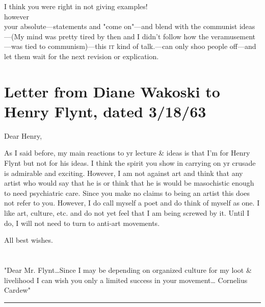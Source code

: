 \vfill
\noindent I think you were right in not giving examples! \\
\vfill
\noindent however \\
your absolute---statements and "come on"---and blend with the communist 
ideas---(My mind was pretty tired by then and I didn't follow how the 
veramusement---was tied to communism)---this \textsc{it} kind of talk.---can only shoo 
people off---and let them wait for the next revision or explication. 

\vfill


\clearpage

\section*{}

\section*{{\normalsize Letter from Diane Wakoski to Henry Flynt, dated 3/18/63}}

\vfill
\vfill

Dear Henry, 

\vfill

As I said before, my main reactions to yr lecture \& ideas is that I'm for 
Henry Flynt but not for his ideas. I think the spirit you show in carrying on 
yr crusade is admirable and exciting. However, I am not against art and think 
that any artist who would say that he is or think that he is would be 
masochistic enough to need psychiatric care. Since you make no claims to 
being an artist this does not refer to you. However, I do call myself a poet 
and do think of myself as one. I like art, culture, etc. and do not yet feel 
that I am being screwed by it. Until I do, I will not need to turn to anti-art 
movements. 

All best wishes. 

\vfill


\vfill
\vfill

\clearpage

\section*{}

\vfill

"Dear Mr. Flynt\ldots Since I may be depending on organized culture for my 
loot \& livelihood I can wish you only a limited success in your movement\ldots 
Cornelius Cardew" 
\plainbreak{2}

\vfill

\clearpage

